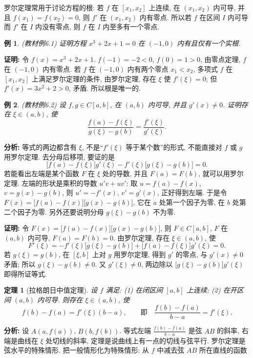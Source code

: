 \documentclass[UTF8,openany]{ctexbook}
\theoremstyle{chinesetextbook}
\newtheorem{example}{例}[section]
\newtheorem{theorem}{定理}[section]
\newenvironment{cnproof}{\par\indent\textbf{证明:} \ignorespaces}{\par}
\begin{document}
罗尔定理常用于讨论方程的根: 若 $f$ 在 $[x_1,x_2]$ 上连续, 在 $(x_1,x_2)$ 内可导, 并且 $f(x_1)=f(x_2)=0$, 则 $f'$ 在 $(x_1,x_2)$ 内有零点. 所以若 $f$ 在区间 $I$ 内可导而 $f'$ 在 $I$ 内没有零点, 则 $f$ 在 $I$ 内至多有一个零点.
\begin{example}\label{ex:c2-6-1}
\textnormal{(教材例6.1)} 证明方程 $x^3+2x+1=0$ 在 $(-1,0)$ 内有且仅有一个实根.
\end{example}
\begin{cnproof}
令 $f(x)=x^3+2x+1$. $f(-1)=-2<0$, $f(0)=1>0$, 由零点定理, $f$ 在 $(-1,0)$ 内有零点. 若 $f$ 在 $(-1,0)$ 内有两个零点 $x_1<x_2$, 多项式 $f$ 在 $[x_1,x_2]$ 上满足罗尔定理的条件, 由罗尔定理, 存在 $\xi$ 使 $f'(\xi)=0$; 但 $f'(x)=3x^2+2>0$, 矛盾. 所以根是唯一的.
\end{cnproof}
\begin{example}\label{ex:c2-6-2}
\textnormal{(教材例6.2)} 设 $f,g\in C[a,b]$, 在 $(a,b)$ 内可导, 并且 $g'(x)\ne0$. 证明存在 $\xi\in(a,b)$, 使
\[
\frac{f(a)-f(\xi)}{g(\xi)-g(b)}=\frac{f'(\xi)}{g'(\xi)}.
\]
\end{example}
\par\indent\textbf{分析:} 等式的两边都含有 $\xi$, 不是“$f'(\xi)$ 等于某个数”的形式, 不能直接对 $f$ 或 $g$ 用罗尔定理. 去分母后移项, 要证的是
\[
\bigl[f(a)-f(\xi)\bigr]g'(\xi)-f'(\xi)\bigl[g(\xi)-g(b)\bigr]=0.
\]
若能看出左端是某个函数 $F$ 在 $\xi$ 处的导数, 并且 $F(a)=F(b)$, 就可以用罗尔定理. 左端的形状是乘积的导数 $u'v+uv'$: 取 $u=f(a)-f(x)$, $v=g(x)-g(b)$, 则 $u'=-f'(x)$, $v'=g'(x)$, 正好得到左端. 于是令 $F(x)=\bigl[f(a)-f(x)\bigr]\bigl[g(x)-g(b)\bigr]$, 它在 $a$ 处第一个因子为零, 在 $b$ 处第二个因子为零. 另外还要说明分母 $g(\xi)-g(b)$ 不为零.
\begin{cnproof}
令 $F(x)=\bigl[f(a)-f(x)\bigr]\bigl[g(x)-g(b)\bigr]$, 则 $F\in C[a,b]$, $F$ 在 $(a,b)$ 内可导, $F(a)=F(b)=0$. 由罗尔定理, 存在 $\xi\in(a,b)$, 使
\[
F'(\xi)=-f'(\xi)\bigl[g(\xi)-g(b)\bigr]+\bigl[f(a)-f(\xi)\bigr]g'(\xi)=0.
\]
若 $g(\xi)=g(b)$, 在 $[\xi,b]$ 上对 $g$ 用罗尔定理, 得到 $g'$ 的零点, 与 $g'(x)\ne0$ 矛盾; 所以 $g(\xi)-g(b)\ne0$. 又 $g'(\xi)\ne0$, 两边除以 $\bigl[g(\xi)-g(b)\bigr]g'(\xi)$ 即得所证等式.
\end{cnproof}
\begin{theorem}[拉格朗日中值定理]\label{thm:c2-6-lagrange}
设 $f$ 满足: (1) 在闭区间 $[a,b]$ 上连续; (2) 在开区间 $(a,b)$ 内可导. 则存在 $\xi\in(a,b)$, 使
\[
f(b)-f(a)=f'(\xi)(b-a),\qquad\text{即}\quad\frac{f(b)-f(a)}{b-a}=f'(\xi).
\]
\end{theorem}
\par\indent\textbf{分析:} 设 $A(a,f(a))$, $B(b,f(b))$. 等式左端 $\displaystyle\frac{f(b)-f(a)}{b-a}$ 是弦 $AB$ 的斜率, 右端是曲线在 $\xi$ 处切线的斜率, 定理是说曲线上有一点的切线与弦平行. 罗尔定理是弦水平的特殊情形. 把一般情形化为特殊情形: 从 $f$ 中减去弦 $AB$ 所在直线的函数
\end{document}
